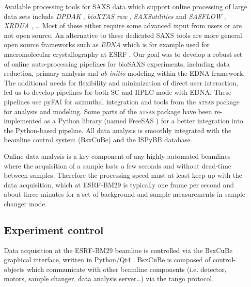 \documentclass[preprint,pdf]{iucr}              %
\begin{document}
Available processing tools for SAXS data which support online processing of
large data sets include \textit{DPDAK} \cite{DPDAK}, \textit{bioXTAS raw}
\cite{BioXTASraw}, \textit{SAXSutilities} \cite{SAXSUtilities} and
\textit{SASFLOW} \cite{X33P,P12},  \textit{XRDUA} \cite{xrdua}, \ldots
Most of these either require some advanced input from users or are not open source.
An alternative to these dedicated SAXS tools are more general open source frameworks such as
\textit{EDNA} which is for example used for macromolecular crystallography at
ESRF \cite{EDNA}.
Our goal was to develop a robust set of online auto-processing pipelines
for bioSAXS experiments, including data reduction, primary analysis and
\textit{ab-initio} modeling  within the EDNA framework.
The additional needs for flexibility and minimization of
direct user interaction, led us to develop pipelines for both SC and HPLC mode with EDNA.
These pipelines use pyFAI for azimuthal integration \cite{pyFAI} and tools
from the \textsc{atsas} package \cite{ATSAS1,ATSAS2} for analysis and modeling.
Some parts of the \textsc{atsas} package have been re-implemented as a Python
library (named FreeSAS \cite{freesas}) for a better integration into the
Python-based pipeline.
All data analysis is smoothly integrated with the beamline control system
(BsxCuBe) and the ISPyBB \cite{ISPYBB} database.


Online data analysis is a key component of any highly automated beamlines
where the acquisition of a sample lasts a few seconds and without dead-time between samples.
Therefore the processing speed must at least keep up with the data acquisition, which
at ESRF-BM29 is typically one frame per second and about three minutes for a set
of background and sample measurements in sample changer mode.


\subsection{Experiment control}
Data acquisition at the ESRF-BM29 beamline is controlled via the BsxCuBe
graphical interface, written in Python/Qt4 \cite{pyqt}.
BsxCuBe is composed of control-objects which communicate with other beamline
components (i.e. detector, motors, sample changer, data analysis server\ldots)
via the tango protocol\cite{tango}.

\end{document}
